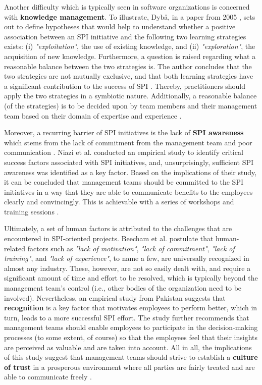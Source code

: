 \documentclass[conference]{IEEEtran}
\begin{document}
Another difficulty which is typically seen in software organizations is
concerned with \textbf{knowledge management}. To illustrate, Dybå, in a paper
from 2005 \cite{Dyba2005}, sets out to define hypotheses that would help to
understand whether a positive association between an SPI initiative and the
following two learning strategies exists: (i) \textit{"exploitation"}, the use
of existing knowledge, and (ii) \textit{"exploration"}, the acquisition of new
knowledge. Furthermore, a question is raised regarding what a reasonable
balance between the two strategies is. The author concludes that the two
strategies are not mutually exclusive, and that both learning strategies have a
significant contribution to the success of SPI \cite{Dyba2005}. Thereby,
practitioners should apply the two strategies in a symbiotic nature.
Additionally, a reasonable balance (of the strategies) is to be decided upon by
team members and their management team based on their domain of expertise and
experience \cite{Dyba2005}.

Moreover, a recurring barrier of SPI initiatives is the lack of \textbf{SPI
awareness} which stems from the lack of commitment from the management team and
poor communication \cite{Niazi2010}. Niazi et al. \cite{Niazi2006} conducted an
empirical study to identify critical success factors associated with SPI
initiatives, and, unsurprisingly, sufficient SPI awareness was identified as a
key factor. Based on the implications of their study, it can be concluded that
management teams should be committed to the SPI initiatives in a way that they
are able to communicate benefits to the employees clearly and convincingly.
This is achievable with a series of workshops and training sessions
\cite{Niazi2006}.

Ultimately, a set of human factors is attributed to the challenges that are
encountered in SPI-oriented projects. Beecham et al. \cite{Beecham2003}
postulate that human-related factors such as \textit{"lack of motivation"},
\textit{"lack of commitment"}, \textit{"lack of training"}, and \textit{"lack
of experience"}, to name a few, are universally recognized in almost any
industry. These, however, are not so easily dealt with, and require a
significant amount of time and effort to be resolved, which is typically beyond
the management team's control (i.e., other bodies of the organization need to
be involved). Nevertheless, an empirical study from Pakistan \cite{Danish2010}
suggests that \textbf{recognition} is a key factor that motivates employees to
perform better, which in turn, leads to a more successful SPI effort. The study
further recommends that management teams should enable employees to participate
in the decision-making processes (to some extent, of course) so that the
employees feel that their insights are perceived as valuable and are taken into
account. All in all, the implications of this study suggest that management
teams should strive to establish a \textbf{culture of trust} in a prosperous
environment where all parties are fairly treated and are able to communicate
freely \cite{Danish2010}.
\end{document}
